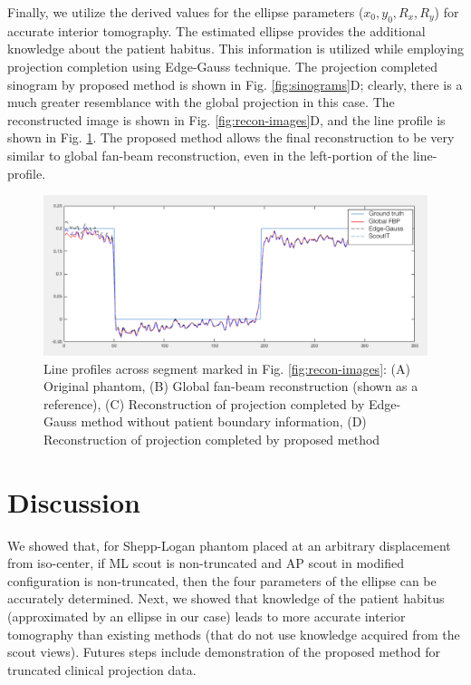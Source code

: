 \documentclass[]{spie}
\begin{document}
Finally, we utilize the derived values for the ellipse parameters ($x_0, y_0, R_x, R_y$) for accurate interior tomography. The estimated ellipse provides the additional knowledge about the patient habitus. This information is utilized while employing projection completion using Edge-Gauss technique. The projection completed sinogram by proposed method is shown in Fig. \ref{fig:sinograms}D; clearly, there is a much greater resemblance with the global projection in this case. The reconstructed image is shown in Fig. \ref{fig:recon-images}D, and the line profile is shown in Fig. \ref{fig:lineprofiles}. The proposed method allows the final reconstruction to be very similar to global fan-beam reconstruction, even in the left-portion of the line-profile. 

\begin{figure}[hbtp]
\centering
\includegraphics[width=15 cm]{fig-lineprofiles}
\caption{Line profiles across segment marked in Fig. \ref{fig:recon-images}: (A) Original phantom, (B) Global fan-beam reconstruction (shown as a reference), (C) Reconstruction of projection completed by Edge-Gauss method without patient boundary information, (D) Reconstruction of projection completed by proposed method \label{fig:lineprofiles}}
\end{figure}




\section{Discussion}

We showed that, for Shepp-Logan phantom placed at an arbitrary displacement from iso-center, if ML scout is non-truncated and AP scout in modified configuration is non-truncated, then the four parameters of the ellipse can be accurately determined. Next, we showed that knowledge of the patient habitus (approximated by an ellipse in our case) leads to more accurate interior tomography than existing methods (that do not use knowledge acquired from the scout views). Futures steps include demonstration of the proposed method for truncated clinical projection data.
\end{document}
